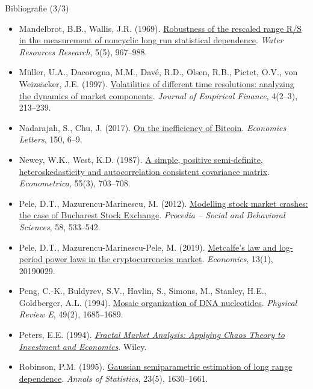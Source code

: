 \begin{frame}{Bibliografie (3/3)}
\itemsize{\tiny}
\begin{itemize}
    \item Mandelbrot, B.B., Wallis, J.R. (1969). \href{https://doi.org/10.1029/WR005i005p00967}{Robustness of the rescaled range R/S in the measurement of noncyclic long run statistical dependence}. \textit{Water Resources Research}, 5(5), 967--988.
    \item Müller, U.A., Dacorogna, M.M., Davé, R.D., Olsen, R.B., Pictet, O.V., von Weizsäcker, J.E. (1997). \href{https://doi.org/10.1016/S0927-5398(97)00007-8}{Volatilities of different time resolutions: analyzing the dynamics of market components}. \textit{Journal of Empirical Finance}, 4(2--3), 213--239.
    \item Nadarajah, S., Chu, J. (2017). \href{https://doi.org/10.1016/j.econlet.2016.10.033}{On the inefficiency of Bitcoin}. \textit{Economics Letters}, 150, 6--9.
    \item Newey, W.K., West, K.D. (1987). \href{https://doi.org/10.2307/1913610}{A simple, positive semi-definite, heteroskedasticity and autocorrelation consistent covariance matrix}. \textit{Econometrica}, 55(3), 703--708.
    \item Pele, D.T., Mazurencu-Marinescu, M. (2012). \href{https://doi.org/10.1016/j.sbspro.2012.09.1030}{Modelling stock market crashes: the case of Bucharest Stock Exchange}. \textit{Procedia -- Social and Behavioral Sciences}, 58, 533--542.
    \item Pele, D.T., Mazurencu-Marinescu-Pele, M. (2019). \href{https://doi.org/10.5018/economics-ejournal.ja.2019-29}{Metcalfe's law and log-period power laws in the cryptocurrencies market}. \textit{Economics}, 13(1), 20190029.
    \item Peng, C.-K., Buldyrev, S.V., Havlin, S., Simons, M., Stanley, H.E., Goldberger, A.L. (1994). \href{https://doi.org/10.1103/PhysRevE.49.1685}{Mosaic organization of DNA nucleotides}. \textit{Physical Review E}, 49(2), 1685--1689.
    \item Peters, E.E. (1994). \href{https://www.wiley.com/en-us/Fractal+Market+Analysis\%3A+Applying+Chaos+Theory+to+Investment+and+Economics-p-9780471585244}{\textit{Fractal Market Analysis: Applying Chaos Theory to Investment and Economics}}. Wiley.
    \item Robinson, P.M. (1995). \href{https://doi.org/10.1214/aos/1176324317}{Gaussian semiparametric estimation of long range dependence}. \textit{Annals of Statistics}, 23(5), 1630--1661.

\end{itemize}
\end{frame}
